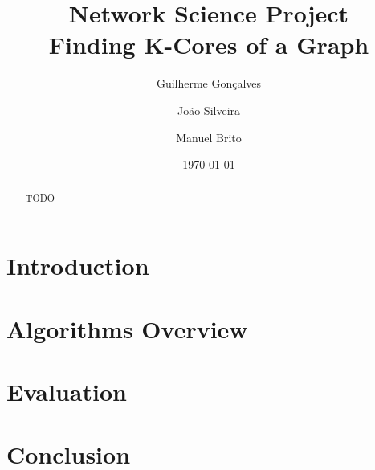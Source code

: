 \documentclass[a4paper, 11pt]{article}
\title{Network Science Project \\ \textbf{Finding K-Cores of a Graph}}
\author{Guilherme Gonçalves \and João Silveira \and Manuel Brito}
\date{\today}
\begin{document}
\maketitle

\begin{abstract}
TODO
\clearpage
\end{abstract}

\clearpage
\tableofcontents
\clearpage

\section{Introduction}


\section{Algorithms Overview}


\section{Evaluation}


\section{Conclusion}


\clearpage


\end{document}

